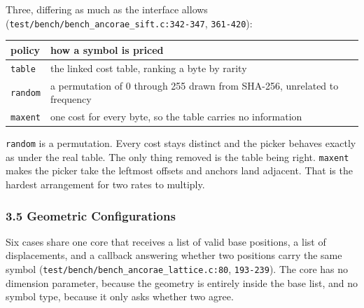 Three, differing as much as the interface allows (\texttt{test/\allowbreak{}bench/\allowbreak{}bench\_\allowbreak{}ancorae\_\allowbreak{}sift.\allowbreak{}c:342-\allowbreak{}347}, \texttt{361-\allowbreak{}420}):

\tiny
\setlength{\tabcolsep}{2pt}
\begin{longtable}{@{}>{\raggedright\arraybackslash}p{}>{\raggedright\arraybackslash}p{}@{}}
\toprule
policy & how a symbol is priced \\
\midrule
\texttt{table} & the linked cost table, ranking a byte by rarity \\
\texttt{random} & a permutation of 0 through 255 drawn from SHA-256, unrelated to frequency \\
\texttt{maxent} & one cost for every byte, so the table carries no information \\
\bottomrule
\end{longtable}
\normalsize

\texttt{random} is a permutation. Every cost stays distinct and the picker behaves exactly as under the real table. The only thing removed is the table being right. \texttt{maxent} makes the picker take the leftmost offsets and anchors land adjacent. That is the hardest arrangement for two rates to multiply.

\subsubsection{3.5 Geometric Configurations}

Six cases share one core that receives a list of valid base positions, a list of displacements, and a callback answering whether two positions carry the same symbol (\texttt{test/\allowbreak{}bench/\allowbreak{}bench\_\allowbreak{}ancorae\_\allowbreak{}lattice.\allowbreak{}c:80}, \texttt{193-\allowbreak{}239}). The core has no dimension parameter, because the geometry is entirely inside the base list, and no symbol type, because it only asks whether two agree.


